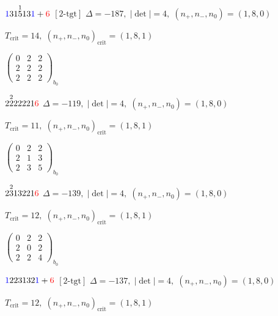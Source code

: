 \documentclass[10pt]{article}
\begin{document}
$\textcolor{blue}{1}31\overset{1}{5}13\textcolor{blue}{1}+\textcolor{red}{6}$ $\scriptstyle [2\text{-tgt}]$ \quad $\Delta=-187,\; |\det|=4,\; (n_+,n_-,n_0)=(1,8,0)$

\hspace{1em}$T_{\text{crit}}=14,\; (n_+,n_-,n_0)_{\text{crit}}=(1,8,1)$

\hspace{2em}$\left(\begin{smallmatrix}0 & 2 & 2 \\ 2 & 2 & 2 \\ 2 & 2 & 2\end{smallmatrix}\right)_{\!b_0}$

\smallskip

$2\overset{2}{2}22221\textcolor{red}{6}$ \quad $\Delta=-119,\; |\det|=4,\; (n_+,n_-,n_0)=(1,8,0)$

\hspace{1em}$T_{\text{crit}}=11,\; (n_+,n_-,n_0)_{\text{crit}}=(1,8,1)$

\hspace{2em}$\left(\begin{smallmatrix}0 & 2 & 2 \\ 2 & 1 & 3 \\ 2 & 3 & 5\end{smallmatrix}\right)_{\!b_0}$

\smallskip

$2\overset{2}{3}13221\textcolor{red}{6}$ \quad $\Delta=-139,\; |\det|=4,\; (n_+,n_-,n_0)=(1,8,0)$

\hspace{1em}$T_{\text{crit}}=12,\; (n_+,n_-,n_0)_{\text{crit}}=(1,8,1)$

\hspace{2em}$\left(\begin{smallmatrix}0 & 2 & 2 \\ 2 & 0 & 2 \\ 2 & 2 & 4\end{smallmatrix}\right)_{\!b_0}$

\smallskip

$\textcolor{blue}{1}223132\textcolor{blue}{1}+\textcolor{red}{6}$ $\scriptstyle [2\text{-tgt}]$ \quad $\Delta=-137,\; |\det|=4,\; (n_+,n_-,n_0)=(1,8,0)$

\hspace{1em}$T_{\text{crit}}=12,\; (n_+,n_-,n_0)_{\text{crit}}=(1,8,1)$
\end{document}
